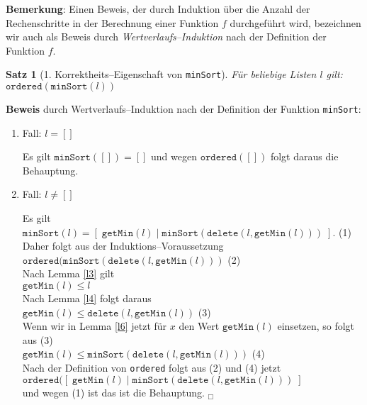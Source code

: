 \documentclass{article}
\newtheorem{Satz}[Definition]{Satz}
\begin{document}
\noindent
\textbf{Bemerkung}: Einen Beweis, der durch Induktion \"uber die Anzahl der Rechenschritte in der Berechnung
einer Funktion $f$ durchgef\"uhrt wird, bezeichnen wir auch als Beweis durch 
\emph{Wertverlaufs--Induktion} nach der Definition der Funktion $f$.

\begin{Satz}[1. Korrektheits--Eigenschaft von \texttt{minSort}] 
F\"ur beliebige Listen $l$ gilt: \\[0.1cm]
\hspace*{1.3cm} $\mathtt{ordered}(\mathtt{minSort}(l))$
\end{Satz}
\textbf{Beweis} durch Wertverlaufs--Induktion nach der Definition der Funktion \texttt{minSort}:
\begin{enumerate}
\item Fall: $l=[]$

      Es gilt $\mathtt{minSort}([]) = []$ und wegen $\mathtt{ordered}([])$ folgt daraus die Behauptung.
\item Fall: $l \not= []$

      Es gilt \\[0.1cm]
      \hspace*{1.3cm}  $\mathtt{minSort}(l) = [\;\mathtt{getMin}(l)\;|\;\mathtt{minSort}(\mathtt{delete}(l,\mathtt{getMin}(l)))\;]$. \hspace*{\fill} (1) \\[0.1cm]
      Daher folgt aus der Induktions--Voraussetzung \\[0.1cm]
      \hspace*{1.3cm} $\mathtt{ordered}(\mathtt{minSort}(\mathtt{delete}(l,\mathtt{getMin}(l)))$ \hspace*{\fill} (2) \\[0.1cm]
      Nach Lemma \ref{l3} gilt \\[0.1cm]
      \hspace*{1.3cm} $\mathtt{getMin}(l) \leq l$ \\[0.1cm]
      Nach Lemma \ref{l4} folgt daraus \\[0.1cm]
      \hspace*{1.3cm} $\mathtt{getMin}(l) \leq \mathtt{delete}(l,\mathtt{getMin}(l))$ \hspace*{\fill} (3) \\[0.1cm]
      Wenn wir in Lemma \ref{l6} jetzt f\"ur $x$ den Wert $\mathtt{getMin}(l)$ einsetzen, so folgt aus (3) \\[0.1cm]
      \hspace*{1.3cm} $\mathtt{getMin}(l) \leq \mathtt{minSort}(\mathtt{delete}(l,\mathtt{getMin}(l)))$ \hspace*{\fill} (4)\\[0.1cm]
      Nach der Definition von \texttt{ordered} folgt aus (2) und (4) jetzt \\[0.1cm]
       \hspace*{1.3cm} $\mathtt{ordered}([\;\mathtt{getMin}(l)\;|\;\mathtt{minSort}(\mathtt{delete}(l,\mathtt{getMin}(l)))\;]$ \\[0.1cm]
      und wegen (1) ist das ist die Behauptung. \hspace*{\fill} $_\Box$
\end{enumerate}
\end{document}

